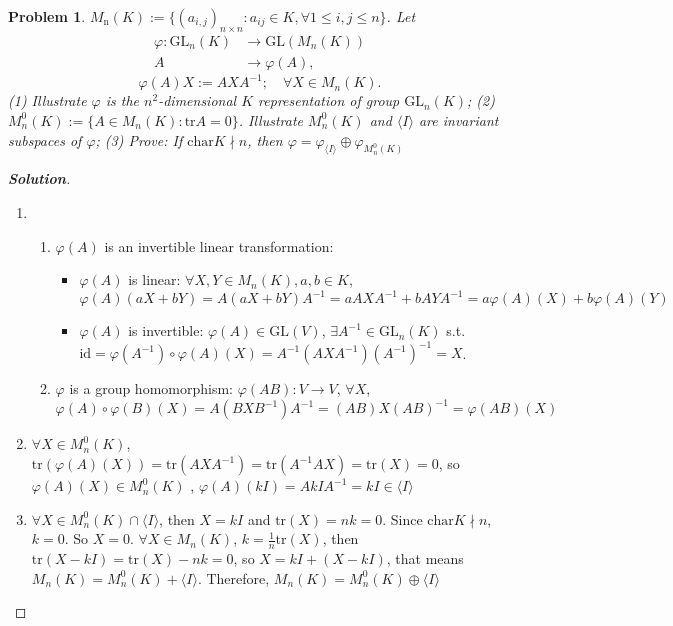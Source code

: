 \documentclass{ctexart}
\newtheorem{problem}{\textbf{Problem}}
\newenvironment{solution}{\begin{proof}[\textbf{Solution}]}{\end{proof}}
\renewcommand\phi{\varphi}
\renewcommand{\(}{\left(}
\renewcommand{\)}{\right)}
\renewcommand{\phi}{\varphi}
\newcommand{\id}{\mathrm{id}}
\newcommand{\chara}{\mathrm{char}}
\newcommand{\tra}{\mathrm{tr}}
\newcommand{\GL}{\mathrm{GL}}
\begin{document}
\begin{problem}
   $M_{\mathrm{n}}(K):=\{(a_{i,j})_{n\times n}:a_{ij}\in K,\forall 1\leq i,j\leq n\}$.
    Let
    $$
    \begin{aligned}
    \varphi: \mathrm{GL}_n(K) & \rightarrow \mathrm{GL}\left(M_n(K)\right) \\
    A & \rightarrow \varphi(A),
    \end{aligned}
    $$
    $$
    \varphi(A) X:=A X A^{-1} ; \quad \forall X \in M_n(K) .
    $$
    (1) Illustrate $\varphi$ is the $n^2$-dimensional $K$ representation of group  $\mathrm{GL}_n(K)$;
    (2) $M_n^0(K):=\{A\in M_n(K):\tra A=0\}$. Illustrate $M_n^0(K)$ and $\langle I\rangle$ are  invariant subspaces of $\varphi$;
    (3) Prove: If $\chara K\nmid n$, then
    $
    \varphi=\varphi_{\langle I\rangle} \oplus \varphi_{M^{0}_n(K)}
    $
\end{problem}
\begin{solution}
\begin{enumerate}
    \item \begin{enumerate}
		\item $\phi(A)$ is an invertible linear transformation:
		\begin{itemize}
			\item $\phi(A)$ is linear: $\forall X, Y \in M_n(K),a,b\in K$, $\phi(A)(aX+bY)=A(aX+bY)A^{-1}=aAXA^{-1}+bAYA^{-1}=a\phi(A)(X)+b\phi(A)(Y)$
			\item $\phi(A)$ is invertible: $\phi(A)\in \GL(V)$, $\exists A^{-1}\in \GL_n(K)$ s.t. $\id=\phi(A^{-1})\circ\phi(A)(X)=A^{-1}(AXA^{-1})(A^{-1})^{-1}=X$.
		\end{itemize}
		\item $\phi$ is a group homomorphism: $\phi(AB): V\to V$, $\forall X$, $\phi(A)\circ\phi(B)(X)=A(BXB^{-1})A^{-1}=(AB)X(AB)^{-1}=\phi(AB)(X)$
	\end{enumerate}
    \item $\forall X\in M_n^0(K)$, $\tra(\phi(A)(X))=\tra(AXA^{-1})=\tra(A^{-1}AX)=\tra(X)=0$, so $\phi(A)(X)\in M^0_n(K)$ , $\phi(A)(kI)=AkIA^{-1}=kI\in \langle I\rangle$
    \item $\forall X\in  M_n^0(K)\cap \langle I\rangle$, then $X=kI$ and $\tra (X)=nk=0$.
    Since $\chara K\nmid n$, $k=0$. So $X=0$. $\forall X\in M_n(K)$, $k=\frac{1}{n}\tra(X)$, then $\tra(X-kI)=\tra(X)-nk=0$, so $X=kI+(X-kI)$, that means $M_n(K)=M_n^0(K)+\langle I\rangle$. Therefore, $M_n(K)=M_n^0(K)\oplus\langle I\rangle$
\end{enumerate}
\end{solution}
\end{document}
